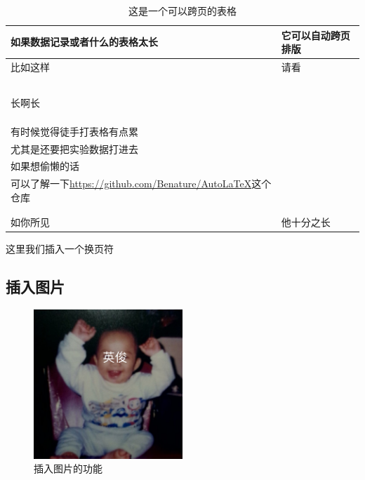 \documentclass{spaexp}
\begin{document}
        \begin{longtable}{p{}||p{}}
            \caption{这是一个可以跨页的表格}\\
            \toprule
            如果数据记录或者什么的表格太长 & 它可以自动跨页排版 \\ \hline
            比如这样 & 请看 \\ \hline
            & \\ \hline
            & \\ \hline
            & \\ \hline
            & \\ \hline
            & \\ \hline
            长啊长 & \\ \hline
            & \\ \hline
            & \\ \hline
            & \\ \hline
            有时候觉得徒手打表格有点累&  \\ \hline
            尤其是还要把实验数据打进去& \\ \hline
            如果想偷懒的话& \\ \hline
            可以了解一下\url{https://github.com/Benature/AutoLaTeX}这个仓库& \\ \hline
            & \\ \hline
            & \\ \hline
            如你所见 & 他十分之长 \\ 
            \bottomrule 
        \end{longtable}
        这里我们插入一个换页符
        \clearpage
    \subsection{插入图片}
        \begin{figure}[h]
            \ct
            \caption{插入图片的功能}\label{fig:handsomeBOY}
            \includegraphics[width = 0.5\textwidth]{img/data1.png}
        \end{figure}
\end{document}
